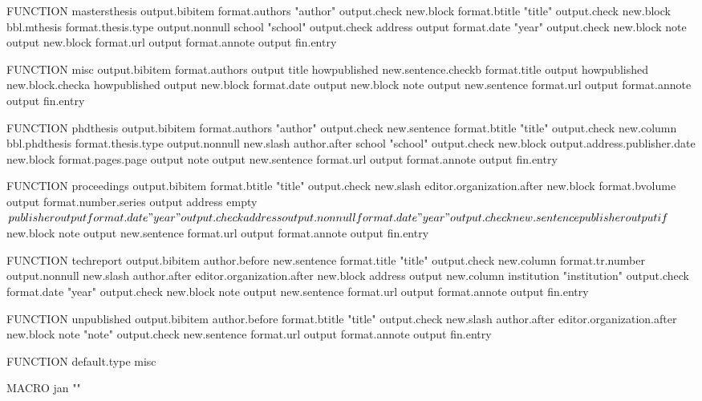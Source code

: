 FUNCTION {mastersthesis}
{ output.bibitem
  format.authors "author" output.check
  new.block
  format.btitle "title" output.check
  new.block
  bbl.mthesis format.thesis.type output.nonnull
  school "school" output.check
  address output
  format.date "year" output.check
  new.block
  note output
  new.block
  format.url output
  format.annote output
  fin.entry
}

FUNCTION {misc}
{ output.bibitem
  format.authors output
  title howpublished new.sentence.checkb
  format.title output
  howpublished new.block.checka
  howpublished output
  new.block
  format.date output
  new.block
  note output
  new.sentence
  format.url output
  format.annote output
  fin.entry
}

FUNCTION {phdthesis}
{ output.bibitem
  format.authors "author" output.check
  new.sentence
  format.btitle "title" output.check
  new.column
  bbl.phdthesis format.thesis.type output.nonnull
  new.slash
  author.after
  school "school" output.check
  new.block
  output.address.publisher.date
  new.block
  format.pages.page output
  note output
  new.sentence
  format.url output
  format.annote output
  fin.entry
}

FUNCTION {proceedings}
{ output.bibitem
  format.btitle "title" output.check
  new.slash
  editor.organization.after
  new.block
  format.bvolume output
  format.number.series output
  address empty$
    { publisher output
      format.date "year" output.check
    }
    { address output.nonnull
      format.date "year" output.check
      new.sentence
      publisher output
    }
  if$
  new.block
  note output
  new.sentence
  format.url output
  format.annote output
  fin.entry
}

FUNCTION {techreport}
{ output.bibitem
  author.before
  new.sentence
  format.title "title" output.check
  new.column
  format.tr.number output.nonnull
  new.slash
  author.after
  editor.organization.after
  new.block
  address output
  new.column
  institution "institution" output.check
  format.date "year" output.check
  new.block
  note output
  new.sentence
  format.url output
  format.annote output
  fin.entry
}

FUNCTION {unpublished}
{ output.bibitem
  author.before
  format.btitle "title" output.check
  new.slash
  author.after
  editor.organization.after
  new.block
  note "note" output.check
  new.sentence
  format.url output
  format.annote output
  fin.entry
}

FUNCTION {default.type} { misc }

MACRO {jan} {"\bbljan{}"}

